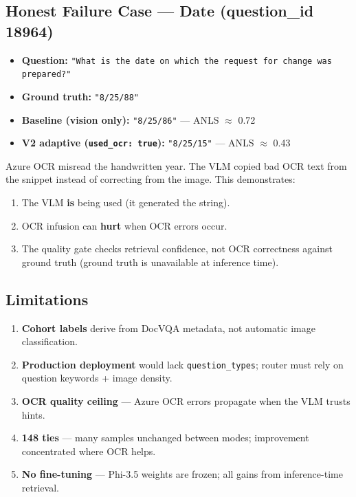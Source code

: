 \documentclass[11pt,a4paper]{article}
\begin{document}
\subsection{Honest Failure Case --- Date (question\_id 18964)}
\begin{itemize}
    \item \textbf{Question:} \texttt{"What is the date on which the request for change was prepared?"}
    \item \textbf{Ground truth:} \texttt{"8/25/88"}
    \item \textbf{Baseline (vision only):} \texttt{"8/25/86"} --- ANLS $\approx$ 0.72
    \item \textbf{V2 adaptive (\texttt{used\_ocr: true}):} \texttt{"8/25/15"} --- ANLS $\approx$ 0.43
\end{itemize}
Azure OCR misread the handwritten year. The VLM copied bad OCR text from the snippet instead of correcting from the image. This demonstrates:
\begin{enumerate}
    \item The VLM \textbf{is} being used (it generated the string).
    \item OCR infusion can \textbf{hurt} when OCR errors occur.
    \item The quality gate checks retrieval confidence, not OCR correctness against ground truth (ground truth is unavailable at inference time).
\end{enumerate}

\subsection{Limitations}
\begin{enumerate}
    \item \textbf{Cohort labels} derive from DocVQA metadata, not automatic image classification.
    \item \textbf{Production deployment} would lack \texttt{question\_types}; router must rely on question keywords + image density.
    \item \textbf{OCR quality ceiling} --- Azure OCR errors propagate when the VLM trusts hints.
    \item \textbf{148 ties} --- many samples unchanged between modes; improvement concentrated where OCR helps.
    \item \textbf{No fine-tuning} --- Phi-3.5 weights are frozen; all gains from inference-time retrieval.
\end{enumerate}
\end{document}
